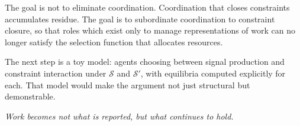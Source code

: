 \documentclass[12pt]{article}
\begin{document}
The goal is not to eliminate coordination. Coordination that closes
constraints accumulates residue. The goal is to subordinate coordination
to constraint closure, so that roles which exist only to manage
representations of work can no longer satisfy the selection function
that allocates resources.

\medskip
\noindent The next step is a toy model: agents choosing between signal
production and constraint interaction under $\mathcal{S}$ and
$\mathcal{S}'$, with equilibria computed explicitly for each. That model
would make the argument not just structural but demonstrable.

\medskip
\begin{center}
\textit{Work becomes not what is reported, but what continues to hold.}
\end{center}
\end{document}
